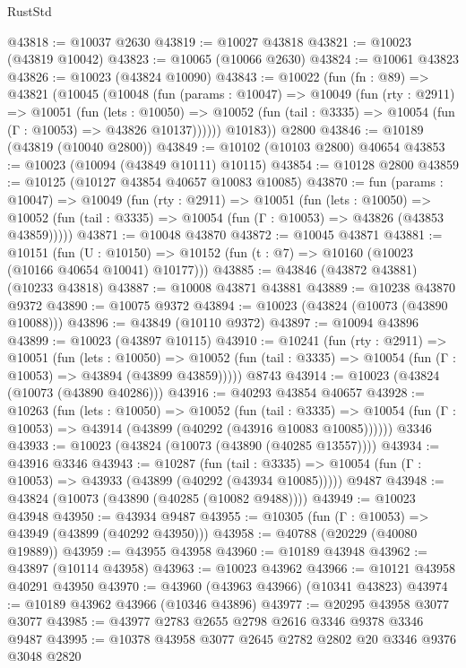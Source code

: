 \begin{lexlean}{RustStd}
\begin{coremodule}
@43818 := @10037 @2630
@43819 := @10027 @43818
@43821 := @10023 (@43819 @10042)
@43823 := @10065 (@10066 @2630)
@43824 := @10061 @43823
@43826 := @10023 (@43824 @10090)
@43843 := @10022
    (fun (fn : @89) =>
    @43821
      (@10045
        (@10048
          (fun (params : @10047) =>
          @10049
            (fun (rty : @2911) =>
            @10051
              (fun (lets : @10050) =>
              @10052 (fun (tail : @3335) => @10054 (fun (Γ : @10053) => @43826 @10137))))))
        @10183))
    @2800
@43846 := @10189 (@43819 (@10040 @2800))
@43849 := @10102 (@10103 @2800) @40654
@43853 := @10023 (@10094 (@43849 @10111) @10115)
@43854 := @10128 @2800
@43859 := @10125 (@10127 @43854 @40657 @10083 @10085)
@43870 := fun (params : @10047) =>
  @10049
    (fun (rty : @2911) =>
    @10051
      (fun (lets : @10050) =>
      @10052 (fun (tail : @3335) => @10054 (fun (Γ : @10053) => @43826 (@43853 @43859)))))
@43871 := @10048 @43870
@43872 := @10045 @43871
@43881 := @10151
    (fun (U : @10150) => @10152 (fun (t : @7) => @10160 (@10023 (@10166 @40654 @10041) @10177)))
@43885 := @43846 (@43872 @43881) (@10233 @43818)
@43887 := @10008 @43871 @43881
@43889 := @10238 @43870 @9372
@43890 := @10075 @9372
@43894 := @10023 (@43824 (@10073 (@43890 @10088)))
@43896 := @43849 (@10110 @9372)
@43897 := @10094 @43896
@43899 := @10023 (@43897 @10115)
@43910 := @10241
    (fun (rty : @2911) =>
    @10051
      (fun (lets : @10050) =>
      @10052 (fun (tail : @3335) => @10054 (fun (Γ : @10053) => @43894 (@43899 @43859)))))
    @8743
@43914 := @10023 (@43824 (@10073 (@43890 @40286)))
@43916 := @40293 @43854 @40657
@43928 := @10263
    (fun (lets : @10050) =>
    @10052
      (fun (tail : @3335) =>
      @10054 (fun (Γ : @10053) => @43914 (@43899 (@40292 (@43916 @10083 @10085))))))
    @3346
@43933 := @10023 (@43824 (@10073 (@43890 (@40285 @13557))))
@43934 := @43916 @3346
@43943 := @10287
    (fun (tail : @3335) => @10054 (fun (Γ : @10053) => @43933 (@43899 (@40292 (@43934 @10085)))))
    @9487
@43948 := @43824 (@10073 (@43890 (@40285 (@10082 @9488))))
@43949 := @10023 @43948
@43950 := @43934 @9487
@43955 := @10305 (fun (Γ : @10053) => @43949 (@43899 (@40292 @43950)))
@43958 := @40788 (@20229 (@40080 @19889))
@43959 := @43955 @43958
@43960 := @10189 @43948
@43962 := @43897 (@10114 @43958)
@43963 := @10023 @43962
@43966 := @10121 @43958 @40291 @43950
@43970 := @43960 (@43963 @43966) (@10341 @43823)
@43974 := @10189 @43962 @43966 (@10346 @43896)
@43977 := @20295 @43958 @3077 @3077
@43985 := @43977 @2783 @2655 @2798 @2616 @3346 @9378 @3346 @9487
@43995 := @10378 @43958 @3077 @2645 @2782 @2802 @20 @3346 @9376 @3048 @2820

\end{coremodule}
\end{lexlean}
